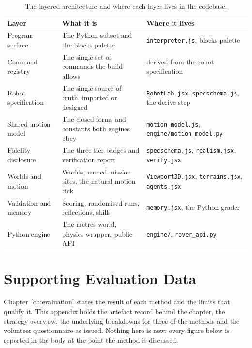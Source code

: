 \documentclass[11pt,a4paper]{report}
\begin{document}
\begin{table}[h]
\centering\small
\renewcommand{\arraystretch}{1.25}
\begin{tabular}{p{3.4cm}p{4.2cm}p{6.4cm}}
\toprule
Layer & What it is & Where it lives \\
\midrule
Program surface & The Python subset and the blocks palette & \texttt{interpreter.js}, blocks palette \\
Command registry & The single set of commands the build allows & derived from the robot specification \\
Robot specification & The single source of truth, imported or designed & \texttt{RobotLab.jsx}, \texttt{specschema.js}, the derive step \\
Shared motion model & The closed forms and constants both engines obey & \texttt{motion-model.js}, \texttt{engine/motion\_model.py} \\
Fidelity disclosure & The three-tier badges and verification report & \texttt{specschema.js}, \texttt{realism.jsx}, \texttt{verify.jsx} \\
Worlds and motion & Worlds, named mission sites, the natural-motion tick & \texttt{Viewport3D.jsx}, \texttt{terrains.jsx}, \texttt{agents.jsx} \\
Validation and memory & Scoring, randomised runs, reflections, skills & \texttt{memory.jsx}, the Python grader \\
Python engine & The metres world, physics wrapper, public API & \texttt{engine/}, \texttt{rover\_api.py} \\
\bottomrule
\end{tabular}
\caption{The layered architecture and where each layer lives in the codebase.}
\label{tab:layers}
\end{table}

\chapter{Supporting Evaluation Data}
\label{app:evaldata}
Chapter~\ref{ch:evaluation} states the result of each method and the limits that qualify it. This appendix holds the artefact record behind the chapter, the strategy overview, the underlying breakdowns for three of the methods and the volunteer questionnaire as issued. Nothing here is new: every figure below is reported in the body at the point the method is discussed.
\end{document}
